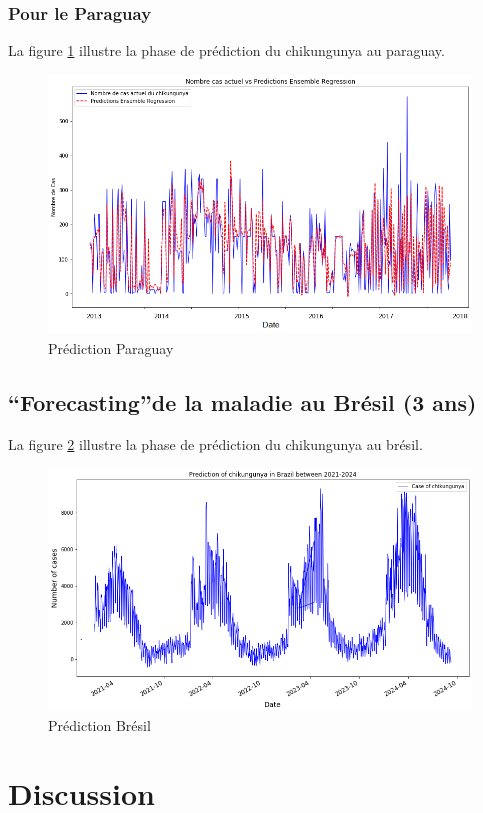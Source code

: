 \subsubsection{Pour le Paraguay}
La figure \ref{fig:predictionparaguay} illustre la phase de prédiction du chikungunya au paraguay. 
\begin{figure}[h!]
	\centering
	\includegraphics[width=0.85\linewidth]{images/prediction_paraguay}
	\caption{Prédiction Paraguay}
	\label{fig:predictionparaguay}
\end{figure}
\subsection{\textquotedblleft Forecasting\textquotedblright de la maladie au Brésil (3 ans)}
La figure \ref{fig:prediction} illustre la phase de prédiction du chikungunya au brésil. 
\begin{figure}[h!]
	\centering
	\includegraphics[width=0.85\linewidth]{images/pred_chikv}
	\caption{Prédiction Brésil}
	\label{fig:prediction}
\end{figure}
\newpage
\section{Discussion}

